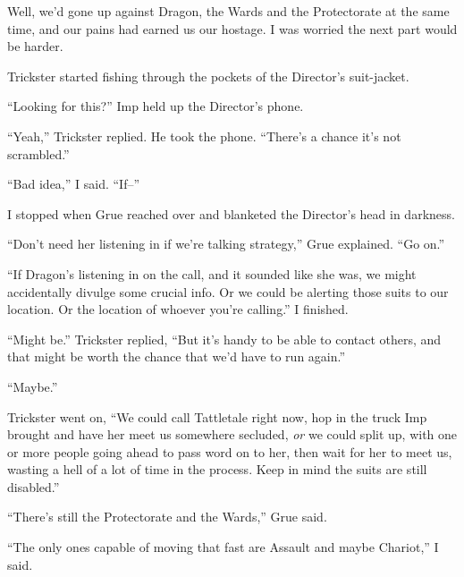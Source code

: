 





Well, we'd gone up against Dragon, the Wards and the Protectorate at the same time, and our pains had earned us our hostage.  I was worried the next part would be harder.



Trickster started fishing through the pockets of the Director's suit-jacket.



``Looking for this?'' Imp held up the Director's phone.



``Yeah,'' Trickster replied.  He took the phone.  ``There's a chance it's not scrambled.''



``Bad idea,'' I said.  ``If--''



I stopped when Grue reached over and blanketed the Director's head in darkness.



``Don't need her listening in if we're talking strategy,'' Grue explained.  ``Go on.''



``If Dragon's listening in on the call, and it sounded like she was, we might accidentally divulge some crucial info.  Or we could be alerting those suits to our location.  Or the location of whoever you're calling.''  I finished.



``Might be.'' Trickster replied, ``But it's handy to be able to contact others, and that might be worth the chance that we'd have to run again.''



``Maybe.''



Trickster went on, ``We could call Tattletale right now, hop in the truck Imp brought and have her meet us somewhere secluded, \emph{or} we could split up, with one or more people going ahead to pass word on to her, then wait for her to meet us, wasting a hell of a lot of time in the process.  Keep in mind the suits are still disabled.''



``There's still the Protectorate and the Wards,'' Grue said.



``The only ones capable of moving that fast are Assault and maybe Chariot,'' I said.




